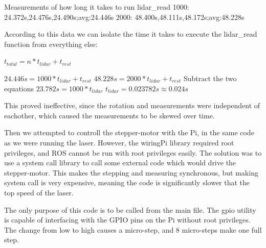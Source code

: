 Measurements of how long it takes to run lidar\_read
1000: 24.372s,24.476s,24.490s;avg:24.446s
2000: 48.400s,48.111s,48.172s;avg:48.228s

According to this data we can isolate the time it takes to execute the lidar\_read function from everything else:

$t_{total} = n*t_{lidar} + t_{rest}$

$24.446s = 1000*t_{lidar} + t_{rest}$
$48.228s = 2000*t_{lidar} + t_{rest}$
Subtract the two equations
$23.782s = 1000*t_{lidar}$
$t_{lidar} = 0.023782s \approx 0.024s$


This proved ineffective, since the rotation and measurements were independent of eachother, which caused the measurements to be skewed over time.

Then we attempted to controll the stepper-motor with the Pi, in the same code as we were running the laser. However, the wiringPi library required root privileges, and ROS cannot be run with root privileges easily. The solution was to use a system call library to call some external code which would drive the stepper-motor. This makes the stepping and measuring synchronous, but making system call is very expensive, meaning the code is significantly slower that the top speed of the laser.




The only purpose of this code is to be called from the main file. The gpio utility is capable of interfacing with the GPIO pins on the Pi without root privileges. The change from low to high causes a micro-step, and 8 micro-steps make one full step.
